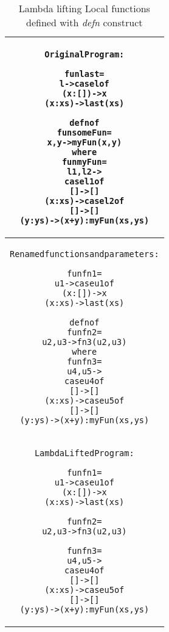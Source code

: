 \documentclass[11pt]{article}
\begin{document}
\begin{table}[h!]
\begin{center}
\begin{tabular}{|c|} \hline
\begin{minipage}{5in}
\begin{alltt}
Original Program :

    fun last =
      l -> case l of 
       (x:[]) -> x 
       (x:xs) -> last(xs) 

    defn of
        fun someFun =
            x, y -> myFun (x,y)
    where
      fun myFun  = 
         l1,l2 ->
           case l1 of 
             []     -> []
             (x:xs) -> case l2 of 
                         [] -> []
                         (y:ys) -> (x+y):myFun (xs,ys)

\end{alltt} 
\end {minipage} \\ 
\hline
\begin{minipage}{5in}
\begin{alltt}
Renamed functions and parameters :

    fun fn1 =
      u1 -> case u1 of 
              (x:[]) -> x 
              (x:xs) -> last(xs)

    defn of
        fun fn2 =
            u2, u3 -> fn3 (u2,u3)
    where
      fun fn3  = 
         u4,u5 ->
           case u4 of 
             []     -> []
             (x:xs) -> case u5 of 
                         [] -> []
                         (y:ys) -> (x+y):myFun (xs,ys)

\end{alltt} 
\end {minipage}\\ 
\hline
\begin{minipage}{5in}
\begin{alltt}
Lambda Lifted Program :

    fun fn1 =
      u1 -> case u1 of 
              (x:[]) -> x 
              (x:xs) -> last(xs)

    fun fn2 =
        u2, u3 -> fn3 (u2,u3)

    fun fn3  = 
         u4,u5 ->
           case u4 of 
             []     -> []
             (x:xs) -> case u5 of 
                         [] -> []
                         (y:ys) -> (x+y):myFun (xs,ys)

\end{alltt} 
\end {minipage} 
\tabularnewline
\hline
\end{tabular}
\caption{Lambda lifting Local functions defined with {\em defn} construct}
\label{LamLiftDefn}
\end{center}
\end{table}
\end{document}
